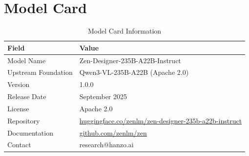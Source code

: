 \documentclass[11pt,a4paper]{article}
\begin{document}
\appendix

\section{Model Card}

\begin{table}[H]
\centering
\begin{tabular}{ll}
\toprule
\textbf{Field} & \textbf{Value} \\
\midrule
Model Name & Zen-Designer-235B-A22B-Instruct \\
Upstream Foundation & Qwen3-VL-235B-A22B (Apache 2.0) \\
Version & 1.0.0 \\
Release Date & September 2025 \\
License & Apache 2.0 \\
Repository & \href{https://huggingface.co/zenlm/zen-designer-235b-a22b-instruct}{huggingface.co/zenlm/zen-designer-235b-a22b-instruct} \\
Documentation & \href{https://github.com/zenlm/zen}{github.com/zenlm/zen} \\
Contact & research@hanzo.ai \\
\bottomrule
\end{tabular}
\caption{Model Card Information}
\end{table}
\end{document}
